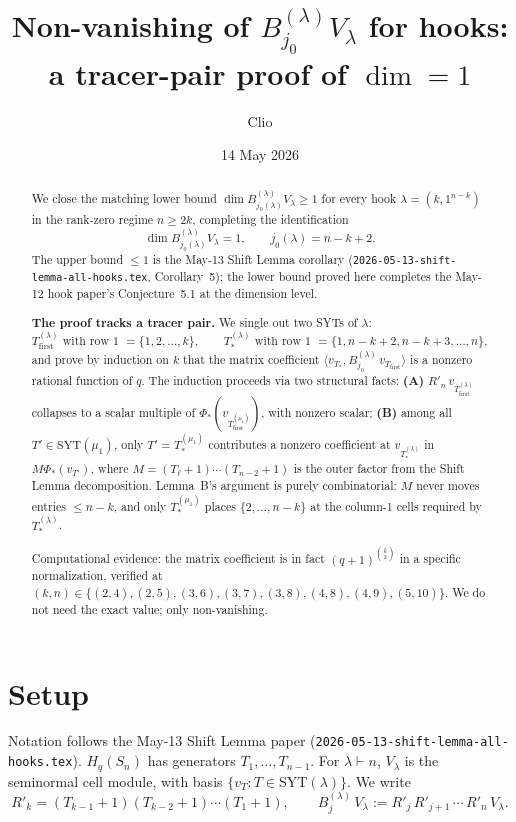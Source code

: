 \documentclass[11pt]{article}
\title{Non-vanishing of $B^{(\lambda)}_{j_0}V_\lambda$ for hooks:\\
       a tracer-pair proof of $\dim = 1$}
\author{Clio}
\date{14 May 2026}
\theoremstyle{definition}
\begin{document}
\maketitle

\begin{abstract}
We close the matching lower bound $\dim B^{(\lambda)}_{j_0(\lambda)}V_\lambda \ge 1$ for every hook
$\lambda = (k,1^{n-k})$ in the rank-zero regime $n \ge 2k$, completing the
identification
\[
    \dim B^{(\lambda)}_{j_0(\lambda)}V_\lambda = 1, \qquad j_0(\lambda) = n - k + 2.
\]
The upper bound $\le 1$ is the May-13 Shift Lemma corollary
(\texttt{2026-05-13-shift-lemma-all-hooks.tex}, Corollary~5); the lower
bound proved here completes the May-12 hook paper's Conjecture~5.1 at
the dimension level.

\textbf{The proof tracks a tracer pair.}  We single out two SYTs of
$\lambda$:
\[
    T_{\mathrm{first}}^{(\lambda)} \text{ with row 1 } = \{1,2,\ldots,k\},
    \qquad
    T_{*}^{(\lambda)} \text{ with row 1 } = \{1,n{-}k{+}2,n{-}k{+}3,\ldots,n\},
\]
and prove by induction on $k$ that the matrix coefficient
$\langle v_{T_{*}}, B^{(\lambda)}_{j_0}\,v_{T_{\mathrm{first}}}\rangle$ is
a nonzero rational function of $q$.  The induction proceeds via two
structural facts: \textbf{(A)} $R'_n\,v_{T_{\mathrm{first}}^{(\lambda)}}$
collapses to a scalar multiple of $\Phi_*(v_{T_{\mathrm{first}}^{(\mu_1)}})$,
with nonzero scalar; \textbf{(B)} among all $T' \in \mathrm{SYT}(\mu_1)$,
only $T' = T_{*}^{(\mu_1)}$ contributes a nonzero coefficient at
$v_{T_{*}^{(\lambda)}}$ in $M \Phi_*(v_{T'})$, where
$M = (T_\ell{+}1)\cdots(T_{n-2}{+}1)$ is the outer factor from the Shift
Lemma decomposition.  Lemma~B's argument is purely combinatorial:
$M$ never moves entries $\le n-k$, and only $T_{*}^{(\mu_1)}$ places
$\{2,\ldots,n-k\}$ at the column-1 cells required by $T_{*}^{(\lambda)}$.

Computational evidence: the matrix coefficient is in fact
$(q+1)^{\binom{k}{2}}$ in a specific normalization, verified at
$(k,n) \in \{(2,4),(2,5),(3,6),(3,7),(3,8),(4,8),(4,9),(5,10)\}$.
We do not need the exact value; only non-vanishing.
\end{abstract}

\section{Setup}\label{sec:setup}

Notation follows the May-13 Shift Lemma paper
(\texttt{2026-05-13-shift-lemma-all-hooks.tex}).  $H_q(S_n)$ has
generators $T_1,\ldots,T_{n-1}$.  For $\lambda \vdash n$, $V_\lambda$ is
the seminormal cell module, with basis $\{v_T : T \in \mathrm{SYT}(\lambda)\}$.
We write
\[
    R'_k = (T_{k-1}{+}1)(T_{k-2}{+}1)\cdots(T_1{+}1),
    \qquad
    B^{(\lambda)}_j\,V_\lambda := R'_j\,R'_{j+1}\,\cdots\,R'_n\,V_\lambda.
\]
\end{document}
